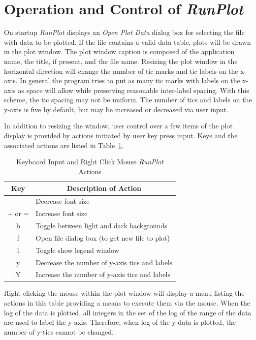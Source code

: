 \documentclass[12pt,twoside]{article}
\newcommand{\prog}[1]{\textsl{#1}}
\numberwithin{equation}{section}
\begin{document}
\section*{Operation and Control of \prog{RunPlot}}

On startup \prog{RunPlot} displays an \textit{Open Plot Data} dialog box for selecting the file with data to be plotted. If the file contains a valid data table, plots will be drawn in the plot window. The plot window caption is composed of the application name, the title, if present, and the file name. Resizing the plot window in the horizontal direction will change the number of tic marks and tic labels on the x-axis. In general the program tries to put as many tic marks with labels on the x-axis as space will allow while preserving reasonable inter-label spacing. With this scheme, the tic spacing may not be uniform. The number of tics and labels on the y-axis is five by default, but may be increased or decreased via user input. 

In addition to resizing the window, user control over a few items of the plot display is provided by actions initiated by user key press input. Keys and the associated actions are listed in Table~\ref{keys-tab}.
\begin{table}[!ht]
  \caption{Keyboard Input and Right Click Mouse \prog{RunPlot} Actions} 
  \vspace{1.5mm}
  \label{keys-tab}
	\centering
		\begin{tabular}{|c|l|}
			\hline
      Key & \multicolumn{1}{c|}{Description of Action} \\
      \hline
			\textbf{--}     & Decrease font size \\
			+ or = & Increase font size \\
      b      & Toggle between light and dark backgrounds \\
			f      & Open file dialog box (to get new file to plot) \\
			l      & Toggle show legend window \\
			y      & Decrease the number of y-axis tics and labels \\
			Y      & Increase the number of y-axis tics and labels \\
			\hline
		\end{tabular}
\end{table}
Right clicking the mouse within the plot window will display a menu listing the actions in this table providing a means to execute them via the mouse. When the log of the data is plotted, all integers in the set of the log of the range of the data are used to label the y-axis. Therefore, when log of the y-data is plotted, the number of y-tics cannot be changed.
\end{document}
